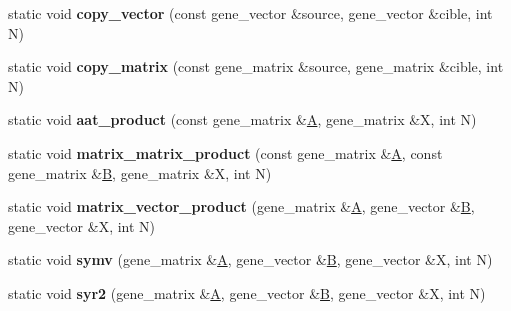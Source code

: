 \begin{DoxyCompactItemize}
static void {\bfseries copy\+\_\+vector} (const gene\+\_\+vector \&source, gene\+\_\+vector \&cible, int N)
\item 
\mbox{\label{class_s_t_l__interface_a39046fc2eadea7d186c78c75243802e0}} 
static void {\bfseries copy\+\_\+matrix} (const gene\+\_\+matrix \&source, gene\+\_\+matrix \&cible, int N)
\item 
\mbox{\label{class_s_t_l__interface_a148dbc43db30109f1133a692909c1ed6}} 
static void {\bfseries aat\+\_\+product} (const gene\+\_\+matrix \&\hyperlink{group___core___module_class_eigen_1_1_matrix}{A}, gene\+\_\+matrix \&X, int N)
\item 
\mbox{\label{class_s_t_l__interface_a062057e758b4cc7e84a2e5d900f0527d}} 
static void {\bfseries matrix\+\_\+matrix\+\_\+product} (const gene\+\_\+matrix \&\hyperlink{group___core___module_class_eigen_1_1_matrix}{A}, const gene\+\_\+matrix \&\hyperlink{group___core___module_class_eigen_1_1_matrix}{B}, gene\+\_\+matrix \&X, int N)
\item 
\mbox{\label{class_s_t_l__interface_ad7400c19bfc252675ddb79f2e990b4a6}} 
static void {\bfseries matrix\+\_\+vector\+\_\+product} (gene\+\_\+matrix \&\hyperlink{group___core___module_class_eigen_1_1_matrix}{A}, gene\+\_\+vector \&\hyperlink{group___core___module_class_eigen_1_1_matrix}{B}, gene\+\_\+vector \&X, int N)
\item 
\mbox{\label{class_s_t_l__interface_a0abb3e5c9d352a4c0e913185b1cce4ab}} 
static void {\bfseries symv} (gene\+\_\+matrix \&\hyperlink{group___core___module_class_eigen_1_1_matrix}{A}, gene\+\_\+vector \&\hyperlink{group___core___module_class_eigen_1_1_matrix}{B}, gene\+\_\+vector \&X, int N)
\item 
\mbox{\label{class_s_t_l__interface_a01bcc8a5c5b1543abb284156dab0b64c}} 
static void {\bfseries syr2} (gene\+\_\+matrix \&\hyperlink{group___core___module_class_eigen_1_1_matrix}{A}, gene\+\_\+vector \&\hyperlink{group___core___module_class_eigen_1_1_matrix}{B}, gene\+\_\+vector \&X, int N)
\item 
\mbox{\label{class_s_t_l__interface_aa8f762ed88dace8bce9b69fc931df160}} 

\end{DoxyCompactItemize}
